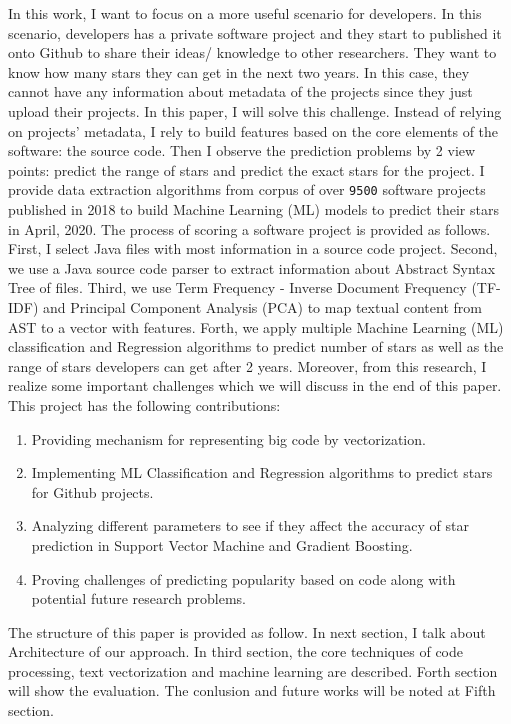 In this work, I want to focus on a more useful scenario for developers. In this scenario, developers has a private software project and they start to published it onto Github to share their ideas/ knowledge to other researchers. They want to know how many stars they can get in the next two years. In this case, they cannot have any information about metadata of the projects since they just upload their projects. In this paper, I will solve this challenge. Instead of relying on projects' metadata, I rely to build features based on the core elements of the software: the source code. Then I observe the prediction problems by 2 view points: predict the range of stars and predict the exact stars for the project. I provide data extraction algorithms from corpus of over \texttt{9500} software projects published in 2018 to build Machine Learning (ML) models to predict their stars in April, 2020. 
The process of scoring a software project is provided as follows. First, I select Java files with most information in a source code project. Second, we use a Java source code parser to extract information about Abstract Syntax Tree of files. Third, we use Term Frequency - Inverse Document Frequency (TF-IDF) and Principal Component Analysis (PCA) to map textual content from AST to a vector with features. Forth, we apply multiple Machine Learning (ML) classification and Regression algorithms to predict number of stars as well as the range of stars developers can get after 2 years. Moreover, from this research, I realize some important challenges which we will discuss in the end of this paper. This project has the following contributions:
\begin{enumerate}
    \item Providing mechanism for representing big code by vectorization.
    \item Implementing ML Classification and Regression algorithms to predict stars for Github projects.
    \item Analyzing different parameters to see if they affect the accuracy of star prediction in Support Vector Machine and Gradient Boosting.
    \item Proving challenges of predicting popularity based on code along with potential future research problems. 
\end{enumerate}

The structure of this paper is provided as follow. In next section, I talk about Architecture of our approach. In third section, the core techniques of code processing, text vectorization and machine learning are described. Forth section will show the evaluation. The conlusion and future works will be noted at Fifth section.
